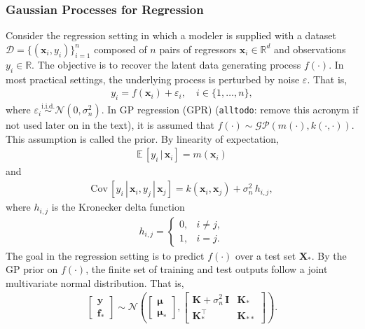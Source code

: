 \documentclass[journal=jacsat,manuscript=article]{achemso}
\newcommand{\alltodo}[1]{{\color{Cyan} (\texttt{alltodo}: #1)}}
\newcommand{\reals}{\ensuremath{\mathbb{R}}}
\newcommand{\xvec}{\ensuremath{\mathbf{x}}}
\newcommand{\xmatrix}{\ensuremath{\mathbf{X}}}
\begin{document}
\subsubsection{Gaussian Processes for Regression}
Consider the regression setting in which a modeler is supplied with a dataset $\mathcal{D} = \{(\xvec_i, y_i)\}_{i=1}^n$ composed of $n$ pairs of regressors $\xvec_i \in \reals^d$ and observations $y_i \in \reals$. The objective is to recover the latent data generating process $f(\cdot)$. In most practical settings, the underlying process is perturbed by noise $\varepsilon$. That is,
\begin{gather*}
    y_i = f(\xvec_i) + \varepsilon_i, \quad i \in \{1,\dots, n\},
\end{gather*}
where $\varepsilon_i \stackrel{\text{i.i.d.}}{\sim} \mathcal{N}(0,\sigma_n^2)$. In GP regression (GPR) \alltodo{remove this acronym if not used later on in the text}, it is assumed that $f(\cdot)\sim \mathcal{GP}(m(\cdot),k(\cdot,\cdot))$. This assumption is called the prior. By linearity of expectation,
\begin{gather*}
    \mathbb{E}\,[y_i\,|\,\xvec_i] = m(\xvec_i)
\end{gather*}
and
\begin{gather*}
    \text{Cov}\,[y_i\, | \,\xvec_i, y_j \, | \,\xvec_j] = k(\xvec_i, \xvec_j) + \sigma_n^2 \,h_{i,j},
\end{gather*}
where $h_{i,j}$ is the Kronecker delta function
\begin{gather*}
    h_{i,j} = 
    \begin{cases}
        0, & i\neq j,\\
        1, & i= j.
    \end{cases}
\end{gather*}
The goal in the regression setting is to predict $f(\cdot)$ over a test set $\xmatrix_*$. By the GP prior on $f(\cdot)$, the finite set of training and test outputs follow a joint multivariate normal distribution. That is,
\begin{gather*}
    \begin{bmatrix}
        \mathbf{y} \\
        \mathbf{f}_*
    \end{bmatrix}
    \sim 
    \mathcal{N}\left(
    \begin{bmatrix}
        \boldsymbol{\mu}\\
        \boldsymbol{\mu}_*
    \end{bmatrix},
    \begin{bmatrix}
        \mathbf{K} +\sigma_n^2\,\mathbf{I} & \mathbf{K}_* \\
        \mathbf{K}^\intercal_* & \mathbf{K}_{**}
    \end{bmatrix} \right).
\end{gather*}
\end{document}
